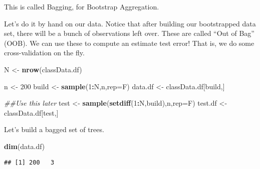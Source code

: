 \documentclass[]{article}
\newenvironment{Shaded}{\begin{snugshade}}{\end{snugshade}}
\newcommand{\CommentTok}[1]{\textcolor[rgb]{0.56,0.35,0.01}{\textit{#1}}}
\newcommand{\DataTypeTok}[1]{\textcolor[rgb]{0.13,0.29,0.53}{#1}}
\newcommand{\DecValTok}[1]{\textcolor[rgb]{0.00,0.00,0.81}{#1}}
\newcommand{\KeywordTok}[1]{\textcolor[rgb]{0.13,0.29,0.53}{\textbf{#1}}}
\newcommand{\NormalTok}[1]{#1}
\newcommand{\OperatorTok}[1]{\textcolor[rgb]{0.81,0.36,0.00}{\textbf{#1}}}
\newcommand{\StringTok}[1]{\textcolor[rgb]{0.31,0.60,0.02}{#1}}
\begin{document}
This is called Bagging, for Bootstrap Aggregation.

Let's do it by hand on our data. Notice that after building our
bootstrapped data set, there will be a bunch of observations left over.
These are called ``Out of Bag'' (OOB). We can use these to compute an
estimate test error! That is, we do some cross-validation on the fly.

\begin{Shaded}
\begin{Highlighting}[]
\NormalTok{N <-}\StringTok{ }\KeywordTok{nrow}\NormalTok{(classData.df)}

\NormalTok{n <-}\StringTok{ }\DecValTok{200}
\NormalTok{build <-}\StringTok{ }\KeywordTok{sample}\NormalTok{(}\DecValTok{1}\OperatorTok{:}\NormalTok{N,n,}\DataTypeTok{rep=}\NormalTok{F)}
\NormalTok{data.df <-}\StringTok{ }\NormalTok{classData.df[build,]}

\CommentTok{##Use this later}
\NormalTok{test <-}\StringTok{ }\KeywordTok{sample}\NormalTok{(}\KeywordTok{setdiff}\NormalTok{(}\DecValTok{1}\OperatorTok{:}\NormalTok{N,build),n,}\DataTypeTok{rep=}\NormalTok{F)}
\NormalTok{test.df <-}\StringTok{ }\NormalTok{classData.df[test,]}
\end{Highlighting}
\end{Shaded}

Let's build a bagged set of trees.

\begin{Shaded}
\begin{Highlighting}[]
\KeywordTok{dim}\NormalTok{(data.df)}
\end{Highlighting}
\end{Shaded}

\begin{verbatim}
## [1] 200   3
\end{verbatim}
\end{document}
